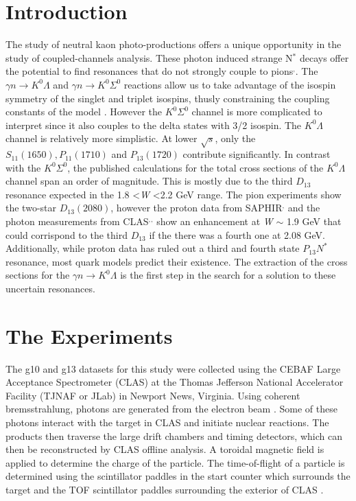 \documentclass[prb,10pt,twocolumn,tightenlines,superscriptaddress]{revtex4-1}
\begin{document}
\section{Introduction}
The study of neutral kaon photo-productions offers a unique opportunity in the study of coupled-channels analysis. These photon induced strange N$^{*}$ decays offer the potential to find resonances that do not strongly couple to pions\cite{bib:ref1a}$^{,}$\cite{bib:ref1b}. The $\gamma n \longrightarrow K^{0}\Lambda$ and $\gamma n \longrightarrow K^{0}\Sigma^{0}$ reactions allow us to take advantage of the isospin symmetry of the singlet and triplet isospins, thusly constraining the coupling constants of the model \cite{bib:ref1c}. However the $K^{0}\Sigma^{0}$ channel is more complicated to interpret since it also couples to the delta states with 3/2 isospin. The $K^{0}\Lambda$ channel is relatively more simplistic. At lower $\sqrt{s}$, only the $S_{11}(1650), P_{11}(1710)$ and $P_{13}(1720)$ contribute significantly. In contrast with the $K^{0}\Sigma^{0}$\cite{bib:model1}, the published calculations for the total cross sections of the $K^{0}\Lambda$ channel span an order of magnitude\cite{bib:model2}. This is mostly due to the third $D_{13}$ resonance expected in the 1.8 \textless \textit{W} \textless 2.2 GeV range\cite{bib:ref1d}. The pion experiments show the two-star $D_{13}(2080)$, however the proton data from SAPHIR\cite{bib:ref1e}$^{,}$\cite{bib:ref1f} and the photon measurements from CLAS\cite{bib:ref1g}$^{,}$\cite{bib:ref1h}$^{,}$\cite{bib:ref1i} show an enhancement at \textit{W} $\sim$ 1.9 GeV that could corrispond to the third $D_{13}$ if the there was a fourth one at 2.08 GeV. Additionally, while proton data has ruled out a third and fourth state $P_{13}N^{*}$ resonance, most quark models predict their existence. The extraction of the cross sections for the $\gamma n \longrightarrow K^{0}\Lambda$ is the first step in the search for a solution to these uncertain resonances.

\section{The Experiments}
The g10 and g13 datasets for this study were collected using the CEBAF Large Acceptance Spectrometer (CLAS) at the Thomas Jefferson National Accelerator Facility (TJNAF or JLab) in Newport News, Virginia. Using coherent bremsstrahlung, photons are generated from the electron beam \cite{bib:ref2}. Some of these photons interact with the target in CLAS and initiate nuclear reactions. The products then traverse the large drift chambers \cite{bib:ref3} and timing detectors, which can then be reconstructed by CLAS offline analysis. A toroidal magnetic field is applied to determine the charge of the particle. The time-of-flight of a particle is determined using the scintillator paddles in the start counter \cite{bib:ref4} which surrounds the target and the TOF scintillator paddles surrounding the exterior of CLAS \cite{bib:ref5}.
\end{document}
